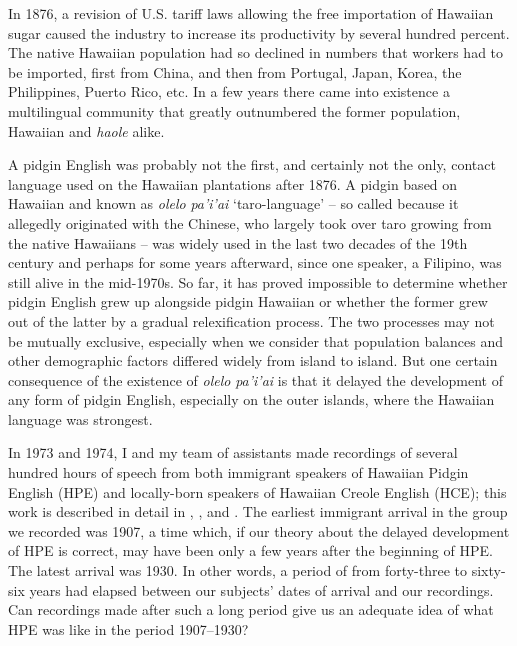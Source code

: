 In 1876, a revision of U.S. tariff laws allowing the free importa\-tion of Hawaiian sugar caused the industry to increase its productivity by several hundred percent. The native Hawaiian population had so declined in numbers that workers had to be imported, first from China, and then from Portugal, Japan, Korea, the Philippines, Puerto Rico, etc. In a few years there came into existence a multilingual community that greatly outnumbered the former population, Hawaiian and \textit{haole} alike.

A pidgin English was probably not the first, and certainly not the only, contact language used on the Hawaiian plantations after 1876. A pidgin based on Hawaiian and known as \textit{olelo} \textit{pa'i'ai} `taro-language' -- so called because it allegedly originated with the Chinese, who largely took over taro growing from the native Hawaiians -- was widely used in the last two decades of the 19th century \citep[307--308]{Bickerton1977} and perhaps for some years afterward, since one speaker, a Filipino, was still alive in the mid-1970s. So far, it has proved impos\-sible to determine whether pidgin English grew up alongside pidgin Hawaiian or whether the former grew out of the latter by a gradual relexification process. The two processes may not be mutually exclu\-sive, especially when we consider that population balances and other demographic factors differed widely from island to island. But one certain consequence of the existence of \textit{olelo} \textit{pa'i'ai} is that it delayed the development of any form of pidgin English, especially on the outer islands, where the Hawaiian language was strongest.

In 1973 and 1974, I and my team of assistants made recordings
of several hundred hours of speech from both immigrant speakers of Hawaiian Pidgin English (HPE) and locally-born speakers of Hawaiian Creole English (HCE); this work is described in detail in \citet{BickertonEtAl1976a}, \citet{BickertonEtAl1976b}, and \citet{Bickerton1977}. The earliest immigrant arrival in the group we recorded was 1907, a time which, if our theory about the delayed development of HPE is correct, may have been only a few years after the beginning of HPE. The latest arrival was 1930. In other words, a period of from forty-three to sixty-six years had elapsed between our subjects' dates of arrival and our recordings. Can recordings made after such a long period give us an adequate idea of what HPE was like in the period 1907--1930?


